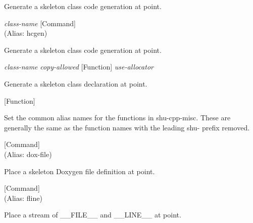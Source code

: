 \begin{doc-string}
Generate a skeleton class code generation at point.
\end{doc-string}

\vspace{1em}
\noindent
{}
\usebox{\funcname}\emph{class-name}
 \hfill [Command]\\%
 (Alias: hcgen)

\begin{doc-string}
Generate a skeleton class code generation at point.
\end{doc-string}

\vspace{1em}
\noindent
{}
\usebox{\funcname}\emph{class-name} \emph{copy-allowed}
 \hfill [Function]
\hspace*{\wd\funcname}\emph{use-allocator}

\begin{doc-string}
Generate a skeleton class declaration at point.
\end{doc-string}

\vspace{1em}
\noindent
{}
\usebox{\funcname}
 \hfill [Function]

\begin{doc-string}
Set the common alias names for the functions in shu-cpp-misc.
These are generally the same as the function names with the leading
shu- prefix removed.
\end{doc-string}

\vspace{1em}
\noindent
{}
\usebox{\funcname}
 \hfill [Command]\\%
 (Alias: dox-file)

\begin{doc-string}
Place a skeleton Doxygen file definition at point.
\end{doc-string}

\vspace{1em}
\noindent
{}
\usebox{\funcname}
 \hfill [Command]\\%
 (Alias: fline)

\begin{doc-string}
Place a stream of \_\_FILE\_\_ and \_\_LINE\_\_ at point.
\end{doc-string}

